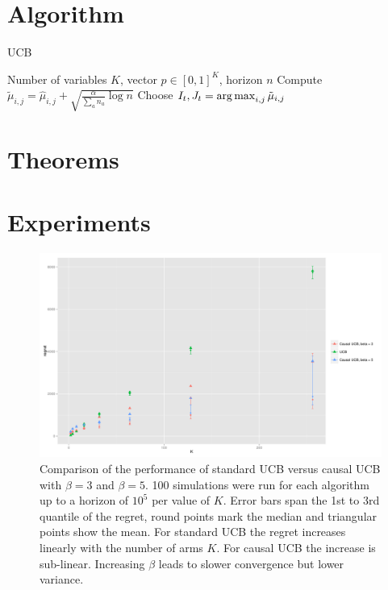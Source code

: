 \documentclass{article}
\newcommand{\set}[1]{\left\{#1\right\}}
\newcommand{\argmax}{\operatornamewithlimits{arg\,max}}
\theoremstyle{plain}
\theoremstyle{definition}
\begin{document}
\section{Algorithm}

\begin{algorithm}
\caption{UCB}
\begin{algorithmic}[1]
 Number of variables $K$, vector $p \in [0,1]^K$, horizon $n$
\For{$j \in \set{0,1}$}
\State Compute $\tilde \mu_{i,j} = \hat \mu_{i,j} + \sqrt{\frac{\alpha}{\sum_{a} n_a} \log n}$ 
\EndFor
\EndFor
\State Choose $I_t, J_t = \argmax_{i,j} \tilde \mu_{i,j}$
\EndFor
\end{algorithmic}
\end{algorithm}

\section{Theorems}
\section{Experiments}



\begin{figure}[h]
\caption{Comparison of the performance of standard UCB versus causal UCB with $\beta=3$ and $\beta = 5$. 100 simulations were run for each algorithm up to a horizon of $10^5$ per value of $K$. Error bars span the 1st to 3rd quantile of the regret, round points mark the median and triangular points show the mean. For standard UCB the regret increases linearly with the number of arms $K$. For causal UCB the increase is sub-linear. Increasing $\beta$ leads to slower convergence but lower variance.}
\includegraphics[width=1\textwidth]{regret_vs_K_series_beta.pdf}
\end{figure}
\end{document}
